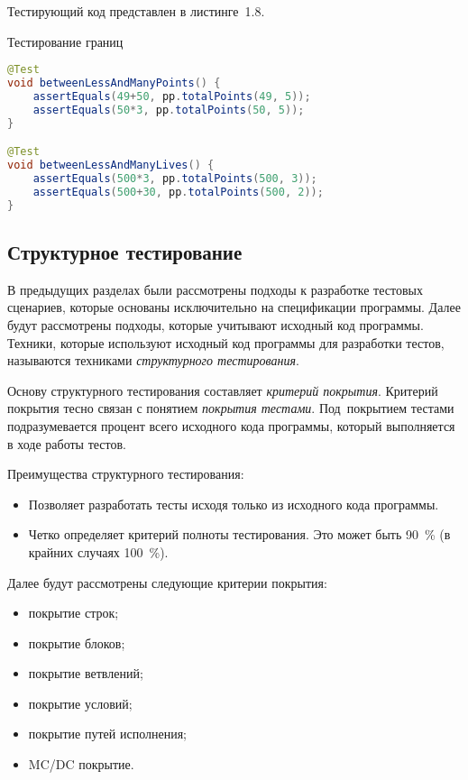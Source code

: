 Тестирующий код представлен в листинге~1.8.

\begin{ListingEnv}[!h]%
	\captiondelim{ } %
	\caption{Тестирование границ}
	\begin{lstlisting}[language={Java}]
@Test
void betweenLessAndManyPoints() {
	assertEquals(49+50, pp.totalPoints(49, 5));
	assertEquals(50*3, pp.totalPoints(50, 5));
}

@Test
void betweenLessAndManyLives() {
	assertEquals(500*3, pp.totalPoints(500, 3));
	assertEquals(500+30, pp.totalPoints(500, 2));
}
	\end{lstlisting}
\end{ListingEnv}%



\subsection{Структурное тестирование} 
 
В предыдущих разделах были рассмотрены подходы к разработке тестовых сценариев, которые основаны исключительно на спецификации программы. Далее будут рассмотрены подходы, которые учитывают исходный код программы. Техники, которые используют исходный код программы для разработки тестов, называются техниками \textit{структурного тестирования}.

Основу структурного тестирования составляет \textit{критерий покрытия}. Критерий покрытия тесно связан с понятием \textit{покрытия тестами}. Под~покрытием тестами подразумевается процент всего исходного кода программы, который выполняется в ходе работы тестов.

Преимущества структурного тестирования:

\begin{itemize}
	\item Позволяет разработать тесты исходя только из исходного кода программы. 
	\item Четко определяет критерий полноты тестирования. Это может быть 90~\% (в крайних случаях 100~\%).
\end{itemize}


Далее будут рассмотрены следующие критерии покрытия:

\begin{itemize}
	\item покрытие строк;
	\item покрытие блоков;
	\item покрытие ветвлений;
	\item покрытие условий;
	\item покрытие путей исполнения;
	\item MC/DC покрытие.
\end{itemize}


